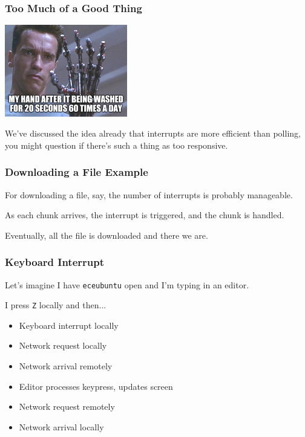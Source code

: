 \begin{frame}
\frametitle{Too Much of a Good Thing}

\begin{center}
	\includegraphics[width=0.4\textwidth]{images/terminator-hand.jpg}
\end{center}

We've discussed the idea already that interrupts are more efficient than polling, you might question if there's such a thing as too responsive. 

\end{frame}


\begin{frame}
\frametitle{Downloading a File Example}

For downloading a file, say, the number of interrupts is probably manageable.

As each chunk arrives, the interrupt is triggered, and the chunk is handled. 

Eventually, all the file is downloaded and there we are.

\end{frame}


\begin{frame}
\frametitle{Keyboard Interrupt}

Let's imagine I have \texttt{eceubuntu} open and I'm typing in an editor.

I press \texttt{Z} locally and then...
\begin{itemize}
	\item Keyboard interrupt locally
	\item Network request locally
	\item Network arrival remotely
	\item Editor processes keypress, updates screen
	\item Network request remotely
	\item Network arrival locally
\end{itemize}

\end{frame}



